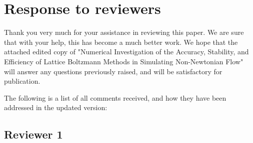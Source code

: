 \documentclass{article}
\begin{document}
	
\section*{Response to reviewers}

Thank you very much for your assistance in reviewing this paper. We are sure that with your help, this has become a much better work. We hope that the attached edited copy of "Numerical Investigation of the Accuracy, Stability, and Efficiency of Lattice Boltzmann Methods in Simulating Non-Newtonian Flow" will answer any questions previously raised, and will be satisfactory for publication.

The following is a list of all comments received, and how they have been addressed in the updated version:

  \subsection{Reviewer 1}
\end{document}
